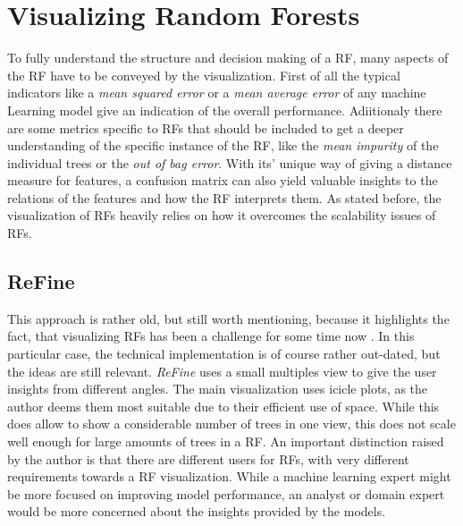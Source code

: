 \documentclass[a4paper, 12pt]{article}
\begin{document}
\section{Visualizing Random Forests}
To fully understand the structure and decision making of a RF, many aspects of the RF have to
be conveyed by the visualization. First of all the typical indicators like a 
\textit{mean squared error} or a \textit{mean average error} of any machine Learning model
give an indication of the overall performance. Adiitionaly there are some metrics specific
to RFs that should be included to get a deeper understanding of the specific instance of the
RF, like the \textit{mean impurity} of the individual trees or the 
\textit{out of bag error}. With its' unique way of giving a distance measure for features,
a confusion matrix can also yield valuable insights to the relations of the features and how
the RF interprets them. As stated before, the visualization of RFs heavily relies on how it
overcomes the scalability issues of RFs.

\subsection{ReFine}
This approach is rather old, but still worth mentioning, because it highlights the fact,
that visualizing RFs has been a challenge for some time now \cite{kuznetsova2014random}.
In this particular case, the technical implementation is of course rather out-dated, but
the ideas are still relevant. \textit{ReFine} uses a small multiples view to give the user
insights from different angles. The main visualization uses icicle plots, as the author
deems them most suitable due to their efficient use of space. While this does allow to
show a considerable number of trees in one view, this does not scale well enough for large
amounts of trees in a RF.
An important distinction raised by the author is that there are different users for RFs,
with very different requirements towards a RF visualization. While a machine learning
expert might be more focused on improving model performance, an analyst or domain expert
would be more concerned about the insights provided by the models.
\end{document}
